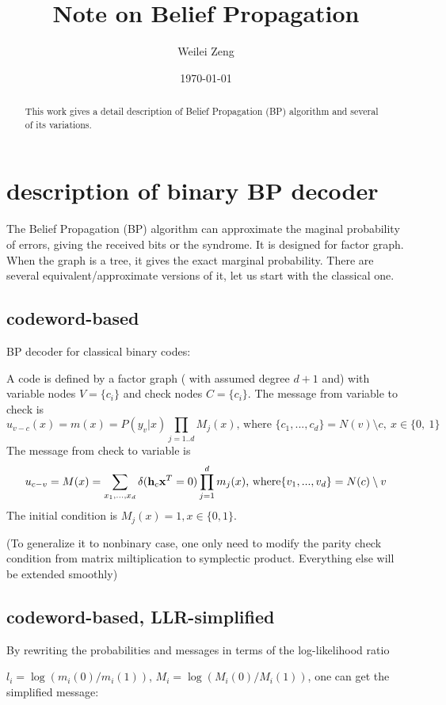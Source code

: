 \documentclass[aps,prb,12pt,tightenlines,%
notitlepage,longbibliography
]{revtex4-1}
\begin{document}
\title{Note on Belief Propagation}
\author{Weilei Zeng}
\date{\today}
\begin{abstract}
  This work gives a detail description of Belief Propagation (BP)
  algorithm and several of its variations.
\end{abstract}

\maketitle


\section{description of binary BP decoder}
The Belief Propagation (BP) algorithm can approximate the maginal
probability of errors, giving the received bits or the syndrome. It is
designed for factor graph. When the graph is a tree, it gives the
exact marginal probability. There are several equivalent/approximate
versions of it, let us start with the classical one.

\subsection{codeword-based}
BP decoder for classical binary codes:

A code is defined by a factor graph ( with assumed degree $d+1$ and) with variable nodes $V=\{c_i\}$
and check nodes $C=\{c_i\}$. The message from variable to check is
$$u_{v-c}(x) =m(x) = P(y_v|x) \prod_{j=1..d}  M_j(x)  \text {, where }
\{c_1,...,c_d \} = N(v)\setminus c,~x \in \{0,~1\}$$
The message from check to variable is
$$u_{c-v} = M(x) = \sum_{x_1,...,x_d} \delta( {\bf h}_c {\bf x}^T=0)
\prod_{j=1}^d m_j(x) \text{, where} \{ v_1,...,v_d \} = N(c)
\setminus v$$
The initial condition is $M_j(x)=1, x \in \{0,1\}$.

(To generalize it to nonbinary case, one only need to modify the
parity check condition from matrix miltiplication to symplectic
product. Everything else will be extended smoothly)

\subsection{codeword-based, LLR-simplified}
By rewriting the probabilities and messages in terms of the
log-likelihood ratio

$l_i=\log( m_i(0)/m_i(1))$, $M_i=\log(
M_i(0)/M_i(1))$, one can get the simplified message:
\end{document}
